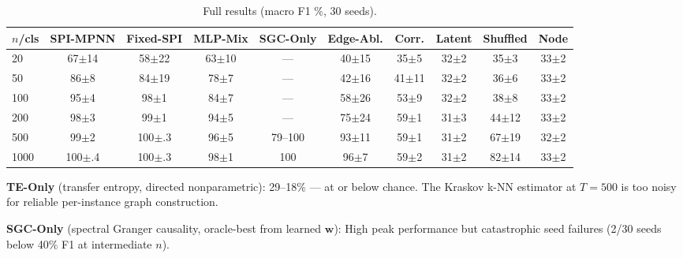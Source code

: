 \documentclass{article}
\theoremstyle{plain}
\begin{document}
\begin{table}[h]
\caption{Full results (macro F1 \%, 30 seeds).}
\label{tab:full}
\vskip 0.1in
\begin{center}
\begin{small}
\begin{tabular}{lccccccccc}
\toprule
$n$/cls & SPI-MPNN & Fixed-SPI & MLP-Mix & SGC-Only & Edge-Abl. & Corr. & Latent & Shuffled & Node \\
\midrule
20   & 67{\scriptsize$\pm$14} & 58{\scriptsize$\pm$22} & 63{\scriptsize$\pm$10} & ---  & 40{\scriptsize$\pm$15} & 35{\scriptsize$\pm$5}  & 32{\scriptsize$\pm$2} & 35{\scriptsize$\pm$3} & 33{\scriptsize$\pm$2} \\
50   & 86{\scriptsize$\pm$8}  & 84{\scriptsize$\pm$19} & 78{\scriptsize$\pm$7}  & ---  & 42{\scriptsize$\pm$16} & 41{\scriptsize$\pm$11} & 32{\scriptsize$\pm$2} & 36{\scriptsize$\pm$6} & 33{\scriptsize$\pm$2} \\
100  & 95{\scriptsize$\pm$4}  & 98{\scriptsize$\pm$1}  & 84{\scriptsize$\pm$7}  & ---  & 58{\scriptsize$\pm$26} & 53{\scriptsize$\pm$9}  & 32{\scriptsize$\pm$2} & 38{\scriptsize$\pm$8} & 33{\scriptsize$\pm$2} \\
200  & 98{\scriptsize$\pm$3}  & 99{\scriptsize$\pm$1}  & 94{\scriptsize$\pm$5}  & ---  & 75{\scriptsize$\pm$24} & 59{\scriptsize$\pm$1}  & 31{\scriptsize$\pm$3} & 44{\scriptsize$\pm$12}& 33{\scriptsize$\pm$2} \\
500  & 99{\scriptsize$\pm$2}  & 100{\scriptsize$\pm$.3}& 96{\scriptsize$\pm$5}  & 79--100 & 93{\scriptsize$\pm$11}& 59{\scriptsize$\pm$1} & 31{\scriptsize$\pm$2} & 67{\scriptsize$\pm$19}& 32{\scriptsize$\pm$2} \\
1000 & 100{\scriptsize$\pm$.4}& 100{\scriptsize$\pm$.3}& 98{\scriptsize$\pm$1}  & 100  & 96{\scriptsize$\pm$7} & 59{\scriptsize$\pm$2}  & 31{\scriptsize$\pm$2} & 82{\scriptsize$\pm$14}& 33{\scriptsize$\pm$2} \\
\bottomrule
\end{tabular}
\end{small}
\end{center}
\end{table}

\textbf{TE-Only} (transfer entropy, directed nonparametric): 29--18\% --- at or below chance. The Kraskov k-NN estimator at $T{=}500$ is too noisy for reliable per-instance graph construction.

\textbf{SGC-Only} (spectral Granger causality, oracle-best from learned $\mathbf{w}$): High peak performance but catastrophic seed failures (2/30 seeds below 40\% F1 at intermediate $n$).
\end{document}
